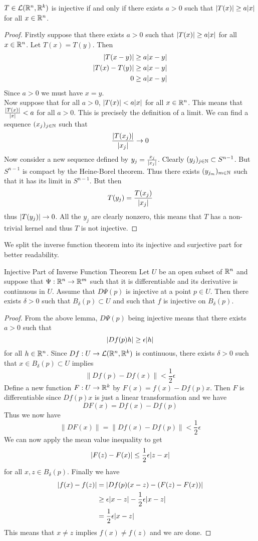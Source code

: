 \documentclass[a4paper]{article}
\begin{document}
\begin{lmm}{}{} $T\in\mathcal{L}(\mathbb{R}^n,\mathbb{R}^k)$ is injective if and only if there exists $a>0$ such that $\abs{T(x)}\geq a\abs{x}$ for all $x\in\mathbb{R}^n$. 
\begin{proof}
Firstly suppose that there exists $a>0$ such that $\abs{T(x)}\geq a\abs{x}$ for all $x\in\mathbb{R}^n$. Let $T(x)=T(y)$. Then 
\begin{align*}
\abs{T(x-y)}&\geq a\abs{x-y}\\
\abs{T(x)-T(y)}&\geq a\abs{x-y}\\
0&\geq a\abs{x-y}
\end{align*}
Since $a>0$ we must have $x=y$. \\
Now suppose that for all $a>0$, $\abs{T(x)}<a\abs{x}$ for all $x\in\mathbb{R}^n$. This means that $\frac{\abs{T(x)}}{\abs{x}}<a$ for all $a>0$. This is precisely the definition of a limit. We can find a sequence $(x_j)_{j\in\mathbb{N}}$ such that $$\frac{\abs{T(x_j)}}{\abs{x_j}}\to 0$$ Now consider a new sequence defined by $y_j=\frac{x_j}{\abs{x_j}}$. Clearly $(y_j)_{j\in\mathbb{N}}\subset S^{n-1}$. But $S^{n-1}$ is compact by the Heine-Borel theorem. Thus there exists $(y_{j_m})_{m\in\mathbb{N}}$ such that it has its limit in $S^{n-1}$. But then $$T(y_j)=\frac{T(x_j)}{\abs{x_j}}$$ thus $\abs{T(y_j)}\to 0$. All the $y_j$ are clearly nonzero, this means that $T$ has a non-trivial kernel and thus $T$ is not injective. 
\end{proof}
\end{lmm}

We split the inverse function theorem into its injective and surjective part for better readability. 

\begin{prp}{Injective Part of Inverse Function Theorem}{} Let $U$ be an open subset of $\mathbb{R}^n$ and suppose that $\Psi:\mathbb{R}^n\to\mathbb{R}^m$ such that it is differentiable and its derivative is continuous in $U$. Assume that $D\Psi(p)$ is injective at a point $p\in U$. Then there exists $\delta>0$ such that $B_\delta(p)\subset U$ and such that $f$ is injective on $B_\delta(p)$. 
\begin{proof}
From the above lemma, $D\Psi(p)$ being injective means that there exists $a>0$ such that $$\abs{Df(p)h}\geq\epsilon\abs{h}$$ for all $h\in\mathbb{R}^n$. Since $Df:U\to\mathcal{L}(\mathbb{R}^n,\mathbb{R}^k)$ is continuous, there exists $\delta>0$ such that $x\in B_\delta(p)\subset U$ implies $$\|Df(p)-Df(x)\|<\frac{1}{2}\epsilon$$ Define a new function $F:U\to\mathbb{R}^k$ by $F(x)=f(x)-Df(p)x$. Then $F$ is differentiable since $Df(p)x$ is just a linear transformation and we have $$DF(x)=Df(x)-Df(p)$$ Thus we now have $$\|DF(x)\|=\|Df(x)-Df(p)\|<\frac{1}{2}\epsilon$$ We can now apply the mean value inequality to get $$\abs{F(z)-F(x)}\leq\frac{1}{2}\epsilon\abs{z-x}$$ for all $x,z\in B_\delta(p)$. Finally we have 
\begin{align*}
\abs{f(x)-f(z)}&=\abs{Df(p)(x-z)-(F(z)-F(x))}\\
&\geq\epsilon\abs{x-z}-\frac{1}{2}\epsilon\abs{x-z}\\
&=\frac{1}{2}\epsilon\abs{x-z}
\end{align*}
This means that $x\neq z$ implies $f(x)\neq f(z)$ and we are done. 
\end{proof}
\end{prp}
\end{document}
